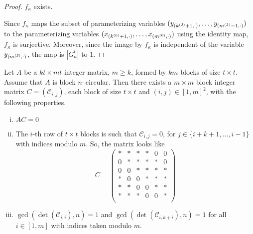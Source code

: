 \begin {proof}
$f_{\kappa }$ exists. \par \par Since $f_{\kappa }$ maps the subset of parameterizing variables $(y_{(k^{\text {\tiny {(J)}}}+1,\cdot )},\ldots ,y_{(m^{\text {\tiny {(J)}}}-1,\cdot )})$ to the parameterizing variables $(x_{(k^{\text {\tiny {(6)}}}+1,\cdot )},\ldots ,x_{(m^{\text {\tiny {(6)}}},\cdot )})$ using the identity map, $f_{\kappa }$ is surjective. Moreover, since the image by $f_{\kappa }$ is independent of the variable $y_{(m^{\text {\tiny {(J)}}},\cdot )}$, the map is $|G_{\kappa }^t|$-to-$1$.
 \end {proof} 
 
 \begin {proposition} 
 \label {p.constr_c} Let $A$ be a $kt\times mt$ integer matrix, $m\geq k$, formed by $km$ blocks of size $t\times t$. Assume that $A$ is block $n$--circular. Then there exists a $m\times m$ block integer matrix $C=(\mathcal {C}_{i,j})$, each block of size $t\times t$ and $(i,j)\in [1,m]^2$, with the following properties. \begin {enumerate}[i.] \item \label {p.p0} $AC=0$ \item \label {p.p1} The $i$-th row of $t\times t$ blocks is such that $\mathcal {C}_{i,j}=0$, for $j\in \{i+k+1,\ldots ,i-1\}$ with indices modulo $m$. So, the matrix looks like \begin {displaymath} C= \begin {pmatrix} \ast & \ast & \ast & \ast & 0 & 0 \\ 0& \ast & \ast & \ast & \ast & 0 \\ 0&0& \ast & \ast & \ast & \ast \\ \ast &0&0& \ast & \ast & \ast \\ \ast &\ast &0&0& \ast & \ast \\ \ast &\ast &\ast &0&0& \ast \\ \end {pmatrix} \end {displaymath} \par \item \label {p.p2} $\gcd (\det (\mathcal {C}_{i,i}),n)=1$ and $\gcd (\det (\mathcal {C}_{i,k+i}),n)=1$ for all $i\in [1,m]$ with indices taken modulo $m$. \end {enumerate}
 \end {proposition} 
 
